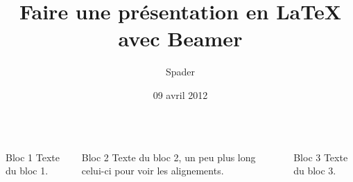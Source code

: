 \documentclass{beamer}
\title{Faire une présentation en LaTeX avec Beamer}
\author{Spader}
\institute{www.siteduzero.com}
\date{09 avril 2012}
\begin{document}
\begin{frame}
\begin{columns}[b]

\begin{column}{2cm}
\begin{block}{Bloc 1}
Texte du bloc 1.
\end{block}
\end{column}

\begin{column}{2cm}
\begin{block}{Bloc 2}
Texte du bloc 2, un peu plus long celui-ci pour voir les alignements.
\end{block}
\end{column}

\begin{column}{2cm}
\begin{block}{Bloc 3}
Texte du bloc 3.
\end{block}
\end{column}

\end{columns}
\end{frame}
\end{document}
